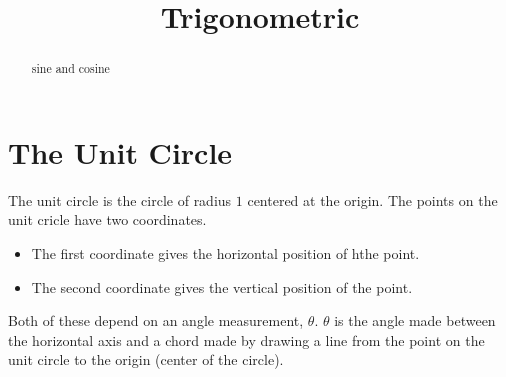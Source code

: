 \documentclass{ximera}
\title{Trigonometric}
\begin{document}
\begin{abstract}
sine and cosine
\end{abstract}
\maketitle















\section{The Unit Circle}


The unit circle is the circle of radius $1$ centered at the origin. The points on the unit cricle have two coordinates.  

\begin{itemize}
\item The first coordinate gives the horizontal position of hthe point. 
\item The second coordinate gives the vertical position of the point.  
\end{itemize}

Both of these depend on an angle measurement, $\theta$. $\theta$ is the angle made between the horizontal axis and a chord made by drawing a line from the point on the unit circle to the origin (center of the circle).
\end{document}
